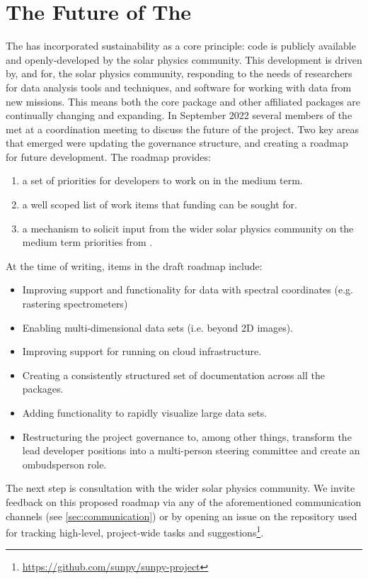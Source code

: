 \section{The Future of The \sunpyproj}
\label{section:roadmap}

The \sunpyproj has incorporated sustainability as a core principle: code is publicly available and openly-developed by the solar physics community.
This development is driven by, and for, the solar physics community, responding to the needs of researchers for data analysis tools and techniques, and software for working with data from new missions.
This means both the \sunpypkg core package and other affiliated packages are continually changing and expanding.
In September 2022 several members of the \sunpyproj met at a coordination meeting to discuss the future of the project.
Two key areas that emerged were updating the governance structure, and creating a roadmap for future development.
The roadmap provides:
\begin{enumerate}
    \item a set of priorities for developers to work on in the medium term.
    \item a well scoped list of work items that funding can be sought for.
    \item a mechanism to solicit input from the wider solar physics community on the medium term priorities from \sunpyproj.
\end{enumerate}

At the time of writing, items in the draft roadmap include:
\begin{itemize}
    \item Improving support and functionality for data with spectral coordinates (e.g. rastering spectrometers)
    \item Enabling multi-dimensional data sets (i.e. beyond 2D images).
    \item Improving support for running \sunpypkg on cloud infrastructure.
    \item Creating a consistently structured set of documentation across all the \sunpyproj packages.
    \item Adding functionality to rapidly visualize large data sets.
    \item Restructuring the project governance to, among other things, transform the lead developer positions into a multi-person steering committee and create an ombudsperson role.
\end{itemize}

The next step is consultation with the wider solar physics community.
We invite feedback on this proposed roadmap via any of the aforementioned communication channels (see \autoref{sec:communication}) or by opening an issue on the repository used for tracking high-level, project-wide tasks and suggestions\footnote{\url{https://github.com/sunpy/sunpy-project}}.
